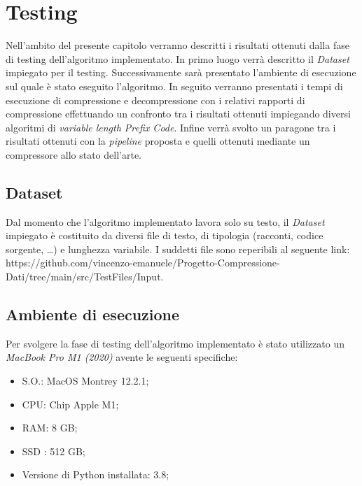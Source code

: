 \chapter{Testing} 

\begin{citazione}
Nell'ambito del presente capitolo verranno descritti i risultati ottenuti dalla fase di testing dell'algoritmo implementato. In primo luogo verrà descritto il \emph{Dataset} impiegato per il testing. Successivamente sarà presentato l'ambiente di esecuzione sul quale è stato eseguito l'algoritmo. In seguito verranno presentati i tempi di esecuzione di compressione e decompressione con i relativi rapporti di compressione effettuando un confronto tra i risultati ottenuti impiegando diversi algoritmi di \emph{variable length Prefix Code}. Infine verrà svolto un paragone tra i risultati ottenuti con la \emph{pipeline} proposta e quelli ottenuti mediante un compressore allo stato dell'arte.
\end{citazione}
\newpage

\section{Dataset}
Dal momento che l'algoritmo implementato lavora solo su testo, il \emph{Dataset} impiegato è costituito da diversi file di testo, di tipologia (racconti, codice sorgente, \dots) e lunghezza variabile. I suddetti file sono reperibili al seguente link: https://github.com/vincenzo-emanuele/Progetto-Compressione-Dati/tree/main/src/TestFiles/Input. 
\section{Ambiente di esecuzione}
Per svolgere la fase di testing dell'algoritmo implementato è stato utilizzato un \emph{MacBook Pro M1 (2020)} avente le seguenti specifiche:
\begin{itemize}
    \item S.O.: MacOS Montrey 12.2.1;
    \item CPU: Chip Apple M1;
    \item RAM: 8 GB;
    \item SSD : 512 GB;
    \item Versione di Python installata: 3.8;
\end{itemize}
